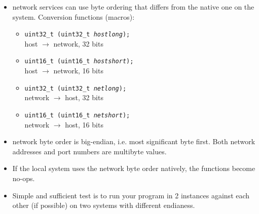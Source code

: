 \begin{slide}
\begin{itemize}
\item network services can use byte ordering that differs from the native
one on the system. Conversion functions (macros):
    \begin{itemize}
    \item\texttt{uint32\_t (uint32\_t \emph{hostlong});}\\
    host $\rightarrow$ network, 32 bits
    \item\texttt{uint16\_t (uint16\_t \emph{hostshort});}\\
    host $\rightarrow$ network, 16 bits
    \item \texttt{uint32\_t (uint32\_t \emph{netlong});}\\
    network $\rightarrow$ host, 32 bits
    \item \texttt{uint16\_t (uint16\_t \emph{netshort});}\\
    network $\rightarrow$ host, 16 bits 
    \end{itemize}
\item network byte order is big-endian, i.e. most significant byte first.
Both network addresses and port numbers are multibyte values.
\end{itemize}
\end{slide}

\label{HTON}

\begin{itemize}
\item If the local system uses the network byte order natively, the functions
become no-ops.
\item Simple and sufficient test is to run your program in 2 instances 
against each other (if possible) on two systems with different endianess.


\end{itemize}



